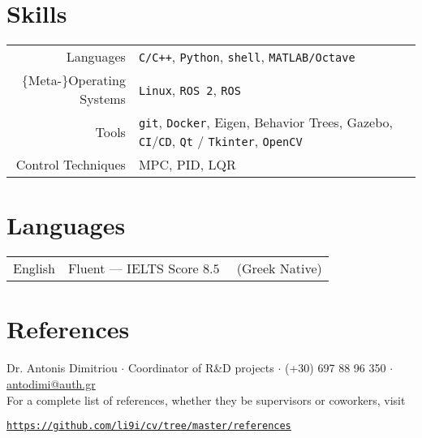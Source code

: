 \documentclass[a4paper,10pt,twoside]{article}
\begin{document}
\section{\textbf{Skills}}

\begin{tabular}{rp{12cm}}
Languages & \texttt{C/C++}, \texttt{Python}, \texttt{shell}, \texttt{MATLAB/Octave} \\
$\{$Meta-$\}$Operating Systems & \texttt{Linux}, \texttt{ROS 2}, \texttt{ROS} \\
  Tools & \texttt{git}, \texttt{Docker}, Eigen, Behavior Trees, Gazebo, \texttt{CI}/\texttt{CD}, \texttt{Qt} / \texttt{Tkinter}, \texttt{OpenCV} \\
Control Techniques & MPC, PID, LQR
\end{tabular}

\section{\textbf{Languages}}

\begin{tabular}{rp{12cm}}
  English & Fluent --- IELTS Score $8.5$ \ \ (Greek Native)
\end{tabular}

\vspace{0.2cm}

\section{\textbf{References}}
\noindent Dr. Antonis Dimitriou $\cdot$ Coordinator of R\&D projects $\cdot$ (+30) 697 88 96 350 $\cdot$ \href{mailto:antodimi@auth.gr}{antodimi@auth.gr} \\

\noindent For a complete list of references, whether they be supervisors or coworkers, visit
\begin{center}\noindent
\href{https://mozilla.github.io/pdf.js/web/viewer.html?file=https://raw.githubusercontent.com/li9i/cv/master/references/references_alexandros_filotheou.pdf}{\texttt{https://github.com/li9i/cv/tree/master/references}}
\end{center}
\end{document}

